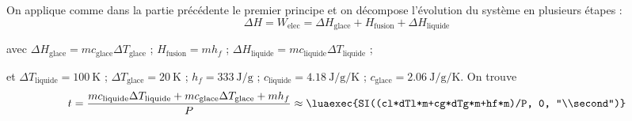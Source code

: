 \documentclass{cours}
\begin{document}
  On applique comme dans la partie précédente le premier principe et on décompose l'évolution du système en plusieurs étapes :
  \begin{equation}
    \Delta H = W_\text{elec} = \Delta H_\text{glace} + H_\text{fusion} + \Delta H_\text{liquide}
  \end{equation}

  avec $\Delta H_\text{glace}=mc_\text{glace}\Delta T_\text{glace}$ ; $H_\text{fusion}=mh_f$ ; $\Delta H_\text{liquide}=mc_\text{liquide}\Delta T_\text{liquide}$ ; 

  et 
  $\Delta T_\text{liquide} = \SI{100}{\kelvin}$ ; $\Delta T_\text{glace} = \SI{20}{\kelvin}$ ; $h_f = \SI{333}{\joule\per\gram}$ ; $c_\text{liquide}=\SI{4.18}{\joule\per\gram\per\kelvin}$ ; $c_\text{glace} = \SI{2.06}{\joule\per\gram\per\kelvin}$. 
  On trouve 
  \begin{equation}
    t= \frac{mc_\text{liquide}\Delta T_\text{liquide}+mc_\text{glace}\Delta T_\text{glace}+mh_f}{P}\approx\luaexec{SI((cl*dTl*m+cg*dTg*m+hf*m)/P, 0, "\\second")}
  \end{equation}
  
  
\end{document}

